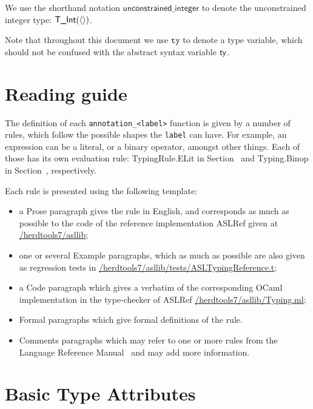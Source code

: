 \documentclass{book}
\newcommand\unconstrainedinteger[0]{\textsf{unconstrained\_integer}}
\newcommand\tty[0]{\texttt{ty}}
\begin{document}
We use the shorthand notation $\unconstrainedinteger$ to denote the unconstrained integer type: $\textsf{T\_Int}(\langle\rangle)$.

Note that throughout this document we use $\tty$ to denote a type variable, which should not be confused with the abstract syntax variable $\textsf{ty}$.

\chapter{Reading guide}

The definition of each \texttt{annotation\_<label>} function is given by a number of
rules, which follow the possible shapes the \texttt{label} can have. For
example, an expression can be a literal, or a binary operator, amongst other
things. Each of those has its own evaluation rule: TypingRule.ELit in
Section~ and
Typing.Binop in Section~, respectively.

Each rule is presented using the following template:
\begin{itemize}
\item a Prose paragraph gives the rule in English, and corresponds as much as possible to the code of the reference implementation ASLRef given at
\href{https://github.com/herd/herdtools7//tree/master/asllib}{/herdtools7/asllib};
\item one or several Example paragraphs, which as much as possible are also given as regression tests in
\href{https://github.com/herd/herdtools7//tree/master/asllib/tests/ASLTypingReference.t}{/herdtools7/asllib/tests/ASLTypingReference.t};
\ifcode
\item a Code paragraph which gives a verbatim of the corresponding OCaml implementation in the type-checker of ASLRef
\href{https://github.com/herd/herdtools7//tree/master/asllib/Typing.ml}{/herdtools7/asllib/Typing.ml};
\fi
\item Formal paragraphs which give formal definitions of the rule.
\item Comments paragraphs which may refer to one or more rules from the Language Reference Manual~\cite{LRM}
      and may add more information.
\end{itemize}

\chapter{Basic Type Attributes}
\end{document}
